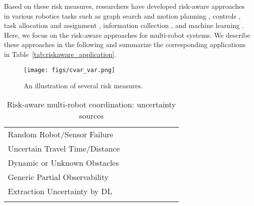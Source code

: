 Based on these risk measures, researchers have developed risk-aware approaches in various robotics tasks such as graph search and motion planning \cite{chow2015risk,chow2017risk,chung2019risk,fridovich2020confidence}, controls \cite{park2018robust,singh2018framework,zhu2019chance}, task allocation and assignment \cite{prorok2019redundant,yang2017algorithm,yang2018algorithm,yang2020chance}, information collection \cite{jorgensen2018team,zhou2018approximation}, and machine learning \cite{chow2017risk,lacotte2019risk}. Here, we focus on the risk-aware approaches for multi-robot systems. We describe these approaches in the following and summarize the corresponding applications in Table~\ref{tab:riskaware_application}.

\begin{figure}
  \centering
  \texttt{[image: figs/cvar\_var.png]}
  \caption{An illustration of several risk measures. }
  \label{fig:riskmea}
\end{figure}


\begin{table*}
\caption{Risk-aware multi-robot coordination: uncertainty sources}
\label{tab:riskaware_uncer_source}  
\centering
\begin{tabular}{llllllll}
\hline\noalign{\smallskip}
Random Robot/Sensor Failure  & \cite{park2018robust,zhou2018approximation} \\
Uncertain Travel Time/Distance & \cite{nam2016analyzing,zhou2018approximation,yang2018algorithm,peltzer2020stt}    \\
Dynamic or Unknown Obstacles & \cite{zhu2019chance,zhu2019b,da2019collision,wang2020non,yang2020chance,fridovich2020confidence,indelman2018cooperative}   \\
Generic Partial Observability  & \cite{kochenderfer2015decision,chow2015risk,oliehoek2016concise,amato2016policy,omidshafiei2017decentralized,amato2019modeling,omidshafiei2017deep,chow2017risk}  \\
Extraction Uncertainty by DL & \cite{Toubeh2019risk2,sharma2020risk}\\

\noalign{\smallskip}\hline
\end{tabular}
\end{table*}

